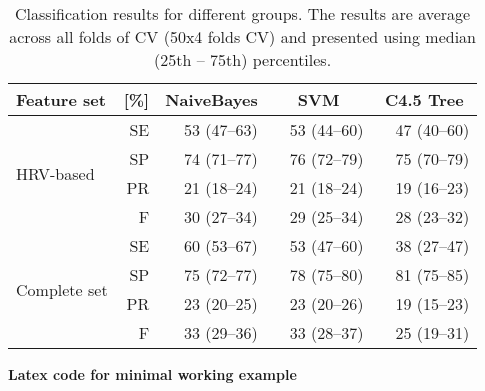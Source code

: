 \documentclass[a4paper,11pt,oneside]{report}
\newcommand{\drawBox}[3]
{
\begin{tikzpicture}
\def\w{1.5} %
\def\x{#1/100*\w} %
\def\xl{#2/100*\w} %
\def\xu{#3/100*\w} %
\filldraw[fill=gray!#1!white!, draw=black] (0,0) rectangle (\x,0.2); %
\draw [gray] (0,0) rectangle (\w,0.2); %
\draw (\x,0.1) -- (\xu,0.1) -- (\xu,0.15) -- (\xu,0.05); %
\draw (\x,0.1) -- (\xl,0.1) -- (\xl,0.15) -- (\xl,0.05); %
\end{tikzpicture} 
}
\newcommand{\boxNumberConf}[3]
{\drawBox{#1}{#2}{#3} & #1 (#2--#3)} %
\begin{document}
\begin{table}[ht!]\small
\centering
\caption{\label{tab:classification_feature_sel} Classification results for 
different groups. The results are average across all folds of CV (50x4 folds CV) and presented using median (25th -- 75th) percentiles.}

\begin{tabular}{p{1.5cm} r lr lr lr}
\toprule
Feature set&[\%]&  \multicolumn{2}{c}{NaiveBayes} &  \multicolumn{2}{c}{SVM} & \multicolumn{2}{c}{C4.5 Tree}\\
\midrule
\multirow{4}{1.5cm}{HRV-based} 
&SE & \boxNumberConf{53}{47}{63} &  \boxNumberConf{53}{44}{60} & \boxNumberConf{47}{40}{60}\\
&SP & \boxNumberConf{74}{71}{77} &  \boxNumberConf{76}{72}{79} & \boxNumberConf{75}{70}{79}\\
&PR & \boxNumberConf{21}{18}{24} &  \boxNumberConf{21}{18}{24} & \boxNumberConf{19}{16}{23}\\
&F  & \boxNumberConf{30}{27}{34} &  \boxNumberConf{29}{25}{34} & \boxNumberConf{28}{23}{32}\\
\midrule
\multirow{4}{1.5cm}{Complete set}
&SE & \boxNumberConf{60}{53}{67} &  \boxNumberConf{53}{47}{60} & \boxNumberConf{38}{27}{47}\\
&SP & \boxNumberConf{75}{72}{77} &  \boxNumberConf{78}{75}{80} & \boxNumberConf{81}{75}{85}\\
&PR & \boxNumberConf{23}{20}{25} &  \boxNumberConf{23}{20}{26} & \boxNumberConf{19}{15}{23}\\
&F  & \boxNumberConf{33}{29}{36} &  \boxNumberConf{33}{28}{37} & \boxNumberConf{25}{19}{31}\\
\bottomrule
\end{tabular}
\end{table}

\newpage
\noindent \textbf{Latex code for minimal working example}
\end{document}
